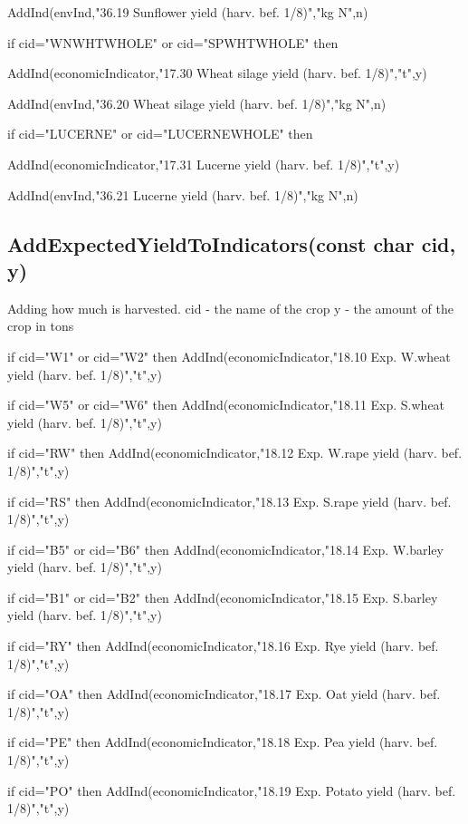 \documentclass[%
]{scrartcl}
\begin{document}
{{{ \quad AddInd(envInd,"36.19 Sunflower yield (harv. bef. 1/8)","kg N",n)
  
   if cid="WNWHTWHOLE" or cid="SPWHTWHOLE" then 

  \quad  
		 AddInd(economicIndicator,"17.30 Wheat silage yield (harv. bef. 1/8)","t",y)
   	
\quad  AddInd(envInd,"36.20 Wheat silage yield (harv. bef. 1/8)","kg N",n)
  
   if cid="LUCERNE" or cid="LUCERNEWHOLE" then 
	
   \quad 	AddInd(economicIndicator,"17.31 Lucerne yield (harv. bef. 1/8)","t",y)
   	 
\quad AddInd(envInd,"36.21 Lucerne yield (harv. bef. 1/8)","kg N",n)



\subsection{AddExpectedYieldToIndicators(const char  cid,   y)}

   Adding how much is harvested.
   cid - the name of the crop
  y - the amount of the crop in tons


   if cid="W1" or cid="W2" then	 AddInd(economicIndicator,"18.10 Exp. W.wheat yield (harv. bef. 1/8)","t",y)
	
if cid="W5" or cid="W6" then AddInd(economicIndicator,"18.11 Exp. S.wheat yield (harv. bef. 1/8)","t",y)
   
if cid="RW"  then     AddInd(economicIndicator,"18.12 Exp. W.rape yield (harv. bef. 1/8)","t",y)
   
if cid="RS"  then   AddInd(economicIndicator,"18.13 Exp. S.rape yield (harv. bef. 1/8)","t",y)
 
  if cid="B5" or cid="B6" then  AddInd(economicIndicator,"18.14 Exp. W.barley yield (harv. bef. 1/8)","t",y)
   
if cid="B1" or cid="B2" then  AddInd(economicIndicator,"18.15 Exp. S.barley yield (harv. bef. 1/8)","t",y)
   
if cid="RY"   then      AddInd(economicIndicator,"18.16 Exp. Rye yield (harv. bef. 1/8)","t",y)
   
if cid="OA"   then   AddInd(economicIndicator,"18.17 Exp. Oat yield (harv. bef. 1/8)","t",y)
   
if cid="PE"   then      AddInd(economicIndicator,"18.18 Exp. Pea yield (harv. bef. 1/8)","t",y)
   
if cid="PO"  then    AddInd(economicIndicator,"18.19 Exp. Potato yield (harv. bef. 1/8)","t",y)
   
}}}
\end{document}
